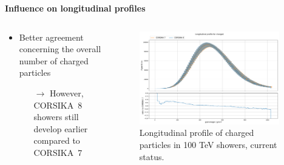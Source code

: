 \documentclass[aspectratio=1610, 9pt]{beamer}
\begin{document}
\begin{frame}

  \textbf{Influence on longitudinal profiles}
  \vspace{5mm}

    \begin{columns}[onlytextwidth]
        \begin{column}{0.4\textwidth}
            \begin{itemize}
              \item Better agreement concerning the overall number of charged particles
              \begin{itemize}
                \item[$\rightarrow$] However, CORSIKA~8 showers still develop earlier compared to CORSIKA~7 
              \end{itemize}
            \end{itemize}
        \end{column}
        \begin{column}{0.6\textwidth}
            \begin{figure}
                \centering
                \includegraphics[width=0.95\textwidth]{plots/long_charged_2023.png}
                \caption{Longitudinal profile of charged particles in 100 \si{\tera\electronvolt} showers, current status.}
            \end{figure}
        \end{column}
    \end{columns}
\end{frame}
\end{document}
